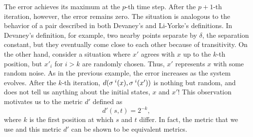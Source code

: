 \documentclass[10pt,twoside]{book}
\begin{document}
The error achieves its maximum at the $p$-th time step.
After the $p+1$-th iteration, however, the error remains zero.
The situation is analogous to the behavior of a pair described in both Devaney's and Li-Yorke's definitions.
In Devaney's definition, for example, two nearby points separate by $\delta$, the separation constant, but they eventually come close to each other because of transitivity.
On the other hand, consider a situation where $x'$ agrees with $x$ up to the $k$-th position, but $x'_i$ for $i > k$ are randomly chosen.
Thus, $x'$ represents $x$ with some random noise.
As in the previous example, the error increases as the system evolves.
After the $k$-th iteration, $d(\sigma^{\;i}(x), \sigma^{\;i}(x'))$ is nothing but random, and does not tell us anything about the initial states, $x$ and $x'$!
This observation motivates us to the metric $d'$ defined as
\begin{equation*}
  d'(s,t) = 2^{-k},
\end{equation*}
where $k$ is the first position at which $s$ and $t$ differ.
In fact, the metric that we use and this metric $d'$ can be shown to be equivalent metrics.
\end{document}
